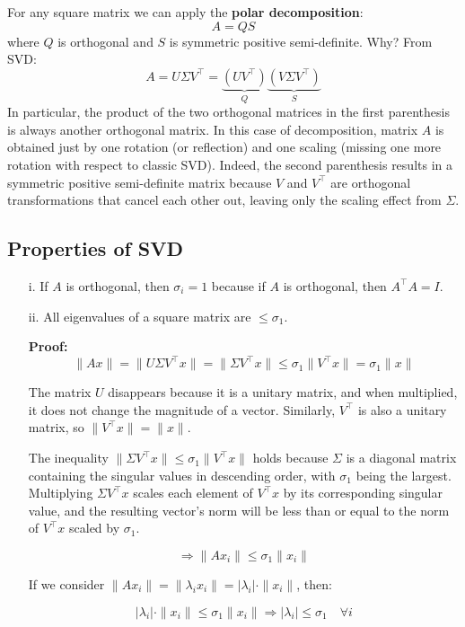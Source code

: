 For any square matrix we can apply the \textbf{polar decomposition}:
\[
A = QS
\]
where \( Q \) is orthogonal and \( S \) is symmetric positive semi-definite. Why? From SVD:
\[
    A = U\Sigma V^\intercal = \underbrace{(UV^\intercal)}_{Q} \underbrace{(V\Sigma V^\intercal)}_{S}
\]
In particular, the product of the two orthogonal matrices in the first parenthesis is always another orthogonal matrix. In this case of decomposition, matrix \( A \) is obtained just by one rotation (or reflection) and one scaling (missing one more rotation with respect to classic SVD). Indeed, the second parenthesis results in a symmetric positive semi-definite matrix because \( V \) and \( V^\intercal \) are orthogonal transformations that cancel each other out, leaving only the scaling effect from \( \Sigma \).

\subsection*{Properties of SVD}

\begin{enumerate}
    \item[i.] If \( A \) is orthogonal, then \( \sigma_i = 1 \) because if \( A \) is orthogonal, then \( A^\top A = I \).

    \item[ii.] All eigenvalues of a square matrix are \( \leq \sigma_1 \).

    \textbf{Proof:}
    \[
    \|Ax\| = \|U\Sigma V^\top x\| = \|\Sigma V^\top x\| \leq \sigma_1 \|V^\top x\| = \sigma_1 \|x\|
    \]
    
    The matrix \( U \) disappears because it is a unitary matrix, and when multiplied, it does not change the magnitude of a vector. Similarly, \( V^\top \) is also a unitary matrix, so \( \|V^\top x\| = \|x\| \).

    The inequality \( \|\Sigma V^\top x\| \leq \sigma_1 \|V^\top x\| \) holds because \( \Sigma \) is a diagonal matrix containing the singular values in descending order, with \( \sigma_1 \) being the largest. Multiplying \( \Sigma V^\top x \) scales each element of \( V^\top x \) by its corresponding singular value, and the resulting vector's norm will be less than or equal to the norm of \( V^\top x \) scaled by \( \sigma_1 \).

    \[
    \Rightarrow \|A x_i\| \leq \sigma_1 \|x_i\|
    \]

    If we consider \( \|A x_i\| = \|\lambda_i x_i\| = |\lambda_i| \cdot \|x_i\| \), then:

    \[
    |\lambda_i| \cdot \|x_i\| \leq \sigma_1 \|x_i\| \Rightarrow |\lambda_i| \leq \sigma_1 \quad \forall i
    \]
\end{enumerate}


